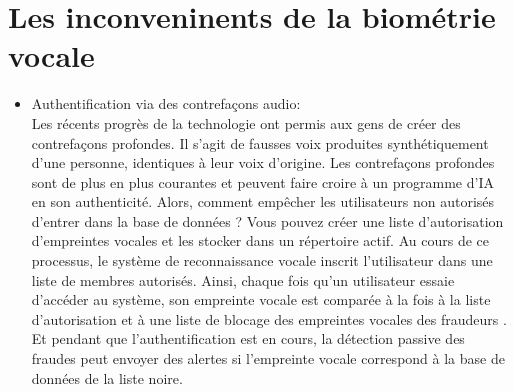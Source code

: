 \section{Les inconveninents de la biométrie vocale}
\begin{itemize}
    \item Authentification via des contrefaçons audio:\\Les récents progrès de la technologie ont permis aux gens de créer des contrefaçons profondes. Il s'agit de fausses voix produites synthétiquement d'une personne, identiques à leur voix d'origine.
    Les contrefaçons profondes sont de plus en plus courantes et peuvent faire croire à un programme d'IA en son authenticité.
    Alors, comment empêcher les utilisateurs non autorisés d'entrer dans la base de données ?
    Vous pouvez créer une liste d'autorisation d'empreintes vocales et les stocker dans un répertoire actif. Au cours de ce processus, le système de reconnaissance vocale inscrit l'utilisateur dans une liste de membres autorisés.
    Ainsi, chaque fois qu'un utilisateur essaie d'accéder au système, son empreinte vocale est comparée à la fois à la liste d'autorisation et à une liste de blocage des empreintes vocales des fraudeurs .
    Et pendant que l'authentification est en cours, la détection passive des fraudes peut envoyer des alertes si l'empreinte vocale correspond à la base de données de la liste noire. 
    

\end{itemize}
